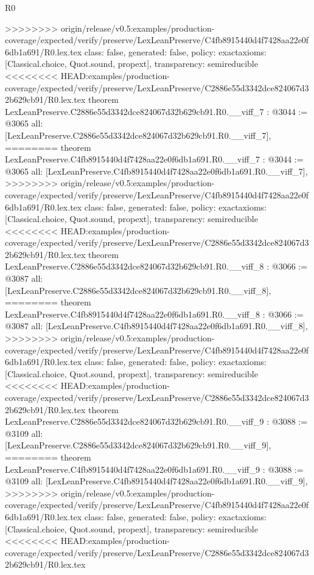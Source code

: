 \begin{lexlean}{R0}
\begin{coremodule}
{{{{{{{{{{{{{{{{{{{{{{{{{{{{{{{{{{{{{{{{{{{{{{{{{{{{{{{{{{{{{{{{>>>>>>>> origin/release/v0.5:examples/production-coverage/expected/verify/preserve/LexLeanPreserve/C4fb8915440d4f7428aa22e0f6db1a691/R0.lex.tex
  class: false,
  generated: false,
  policy: exact{axioms: [Classical.choice, Quot.sound, propext]},
  transparency: semireducible
}
<<<<<<<< HEAD:examples/production-coverage/expected/verify/preserve/LexLeanPreserve/C2886e55d3342dce824067d32b629cb91/R0.lex.tex
theorem LexLeanPreserve.C2886e55d3342dce824067d32b629cb91.R0.__viff_7 : @3044 := @3065 {
  all: [LexLeanPreserve.C2886e55d3342dce824067d32b629cb91.R0.__viff_7],
========
theorem LexLeanPreserve.C4fb8915440d4f7428aa22e0f6db1a691.R0.__viff_7 : @3044 := @3065 {
  all: [LexLeanPreserve.C4fb8915440d4f7428aa22e0f6db1a691.R0.__viff_7],
>>>>>>>> origin/release/v0.5:examples/production-coverage/expected/verify/preserve/LexLeanPreserve/C4fb8915440d4f7428aa22e0f6db1a691/R0.lex.tex
  class: false,
  generated: false,
  policy: exact{axioms: [Classical.choice, Quot.sound, propext]},
  transparency: semireducible
}
<<<<<<<< HEAD:examples/production-coverage/expected/verify/preserve/LexLeanPreserve/C2886e55d3342dce824067d32b629cb91/R0.lex.tex
theorem LexLeanPreserve.C2886e55d3342dce824067d32b629cb91.R0.__viff_8 : @3066 := @3087 {
  all: [LexLeanPreserve.C2886e55d3342dce824067d32b629cb91.R0.__viff_8],
========
theorem LexLeanPreserve.C4fb8915440d4f7428aa22e0f6db1a691.R0.__viff_8 : @3066 := @3087 {
  all: [LexLeanPreserve.C4fb8915440d4f7428aa22e0f6db1a691.R0.__viff_8],
>>>>>>>> origin/release/v0.5:examples/production-coverage/expected/verify/preserve/LexLeanPreserve/C4fb8915440d4f7428aa22e0f6db1a691/R0.lex.tex
  class: false,
  generated: false,
  policy: exact{axioms: [Classical.choice, Quot.sound, propext]},
  transparency: semireducible
}
<<<<<<<< HEAD:examples/production-coverage/expected/verify/preserve/LexLeanPreserve/C2886e55d3342dce824067d32b629cb91/R0.lex.tex
theorem LexLeanPreserve.C2886e55d3342dce824067d32b629cb91.R0.__viff_9 : @3088 := @3109 {
  all: [LexLeanPreserve.C2886e55d3342dce824067d32b629cb91.R0.__viff_9],
========
theorem LexLeanPreserve.C4fb8915440d4f7428aa22e0f6db1a691.R0.__viff_9 : @3088 := @3109 {
  all: [LexLeanPreserve.C4fb8915440d4f7428aa22e0f6db1a691.R0.__viff_9],
>>>>>>>> origin/release/v0.5:examples/production-coverage/expected/verify/preserve/LexLeanPreserve/C4fb8915440d4f7428aa22e0f6db1a691/R0.lex.tex
  class: false,
  generated: false,
  policy: exact{axioms: [Classical.choice, Quot.sound, propext]},
  transparency: semireducible
}
<<<<<<<< HEAD:examples/production-coverage/expected/verify/preserve/LexLeanPreserve/C2886e55d3342dce824067d32b629cb91/R0.lex.tex
}}}}}}}}}}}}}}}}}}}}}}}}}}}}}}}}}}}}}}}}}}}}}}}}}}}}}}}}}}}}}}}}}}
\end{coremodule}
\end{lexlean}
